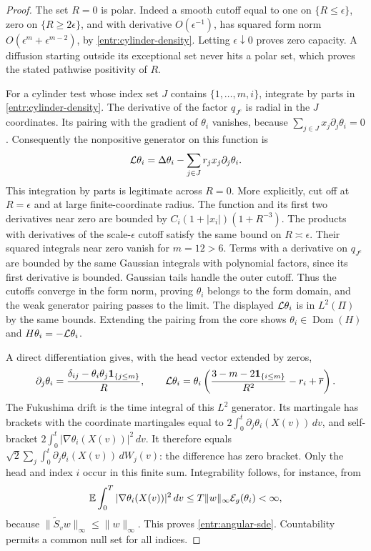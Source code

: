 \begin{proof}
The set \(R=0\) is polar.  Indeed a smooth cutoff equal to one on
\(\{R\le\epsilon\}\), zero on \(\{R\ge2\epsilon\}\), and with derivative
\(O(\epsilon^{-1})\), has squared form norm
\(O(\epsilon^m+\epsilon^{m-2})\), by \eqref{entr:cylinder-density}.
Letting \(\epsilon\downarrow0\) proves zero capacity.  A diffusion
starting outside its exceptional set never hits a polar set, which
proves the stated pathwise positivity of \(R\).

For a cylinder test whose index set \(J\) contains
\(\{1,\ldots,m,i\}\), integrate by parts in
\eqref{entr:cylinder-density}.  The derivative of the factor \(q_{J^c}\)
is radial in the \(J\) coordinates.  Its pairing with the gradient of
\(\theta_i\) vanishes, because
\(\sum_{j\in J}x_j\partial_j\theta_i=0\).  Consequently the
nonpositive generator on this function is
\[
 \mathcal L\theta_i=\Delta\theta_i-\sum_{j\in J}r_jx_j\partial_j\theta_i.
\]
This integration by parts is legitimate across \(R=0\).  More
explicitly, cut off at \(R=\epsilon\) and at large finite-coordinate
radius.  The function and its first two derivatives near zero are
bounded by
\(C_i(1+|x_i|)(1+R^{-3})\).  The products with derivatives of the
scale-\(\epsilon\) cutoff satisfy the same bound on \(R\asymp\epsilon\).
Their squared integrals near zero vanish for \(m=12>6\).
Terms with a derivative on \(q_{J^c}\) are bounded by the same Gaussian
integrals with polynomial factors, since its first derivative is
bounded.  Gaussian tails handle the outer cutoff.  Thus the cutoffs
converge in the form norm, proving \(\theta_i\) belongs to the form
domain, and the weak generator pairing passes to the limit.
The displayed \(\mathcal L\theta_i\) is in \(L^2(\Pi)\) by the same bounds.
Extending the pairing from the core shows
\(\theta_i\in\operatorname{Dom}(H)\) and \(H\theta_i=-\mathcal L\theta_i\).

A direct differentiation gives, with the head vector extended by zeros,
\[
 \partial_j\theta_i=\frac{\delta_{ij}-\theta_i\theta_j\mathbf 1_{\{j\le m\}}}{R},
 \qquad
 \mathcal L\theta_i
 =\theta_i\left(\frac{3-m-2\mathbf 1_{\{i\le m\}}}{R^2}
                         -r_i+\overline r\right).
\]
The Fukushima drift is the time integral of this \(L^2\) generator.
Its martingale has brackets with the coordinate martingales equal to
\(2\int_0^t\partial_j\theta_i(X(v))\,dv\), and self-bracket
\(2\int_0^t|\nabla\theta_i(X(v))|^2\,dv\).
It therefore equals
\(\sqrt2\sum_j\int_0^t\partial_j\theta_i(X(v))\,dW_j(v)\):
the difference has zero bracket.  Only the head and index \(i\)
occur in this finite sum.  Integrability follows, for instance, from
\[
 \mathbb E\int_0^T|\nabla\theta_i(X(v))|^2\,dv
 \le T\|w\|_\infty\mathcal E_g(\theta_i)<\infty,
\]
because \(\|\widetilde S_vw\|_\infty\le\|w\|_\infty\).
This proves \eqref{entr:angular-sde}.  Countability permits a common
null set for all indices.
\end{proof}


